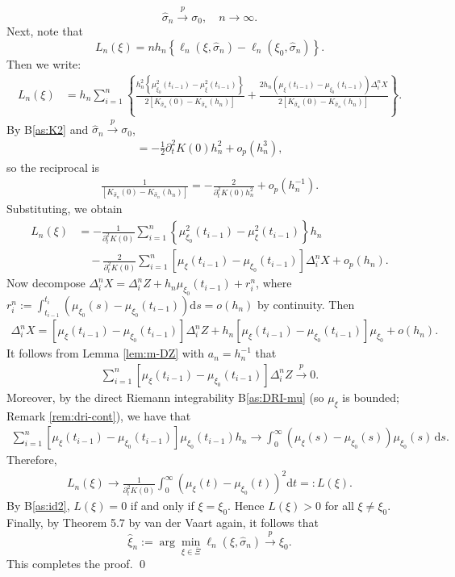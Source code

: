 \documentclass[a4paper,10pt,twoside]{article}
\numberwithin{equation}{section}
\def\D{\Delta}
\def\l{\left}
\def\r{\right}
\def\s{\sigma}
\def\p{\partial}
\def\F{\mathcal{F}}
\def\toP{\stackrel{p}{\longrightarrow}}
\def\E{\mathbb{E}}
\def\wh#1{\widehat{#1}}
\def\ol#1{\overline{#1}}
\def\df{\mathrm{d}}
\begin{document}
\[
\wh{\s}_n \toP \s_0,\quad n\to \infty. 
\]
Next, note that 
\[
L_n(\xi) = n h_n \l\{ \ell_n(\xi, \wh{\s}_n) - \ell_n(\xi_0, \wh{\s}_n) \r\}. 
\]
Then we write:
\begin{align*}
L_n(\xi) &= h_n\sum_{i=1}^n \l\{ \frac{ h_n^2 \l\{ \mu_{\xi_0}^2(t_{i-1}) - \mu_\xi^2(t_{i-1}) \r\} }{2 [K_{\wh{\s}_n}(0) - K_{\wh{\s}_n}(h_n)]} + \frac{ 2 h_n (\mu_\xi(t_{i-1}) - \mu_{\xi_0}(t_{i-1})) \D_i^n X }{2 [K_{\wh{\s}_n}(0) - K_{\wh{\s}_n}(h_n)]} \r\}.
\end{align*}
By B\ref{as:K2} and $\wh{\s}_n \toP \s_0$,
\begin{align*}
[K_{\wh{\s}_n}(0) - K_{\wh{\s}_n}(h_n)] = -\frac{1}{2} \p_t^2 K(0) h_n^2 + o_p(h_n^3),
\end{align*}
so the reciprocal is
\begin{align*}
\frac{1}{[K_{\wh{\s}_n}(0) - K_{\wh{\s}_n}(h_n)]} = -\frac{2}{\p_t^2 K(0) h_n^2} + o_p(h_n^{-1}).
\end{align*}
Substituting, we obtain
\begin{align*}
L_n(\xi) &= -\frac{1}{\p_t^2 K(0)} \sum_{i=1}^n \l\{ \mu_{\xi_0}^2(t_{i-1}) - \mu_\xi^2(t_{i-1}) \r\}h_n  \\
&\quad - \frac{2}{\p_t^2 K(0)} \sum_{i=1}^n[\mu_\xi(t_{i-1}) - \mu_{\xi_0}(t_{i-1})]\D_i^n X + o_p(h_n).
\end{align*}
Now decompose $\D_i^n X = \D_i^n Z + h_n \mu_{\xi_0}(t_{i-1}) + r_i^n$, where $r_i^n := \int_{t_{i-1}}^{t_i} (\mu_{\xi_0}(s) - \mu_{\xi_0}(t_{i-1})) \df s = o(h_n)$ by continuity.
Then
\begin{align*}
[\mu_\xi(t_{i-1}) - \mu_{\xi_0}(t_{i-1})] \D_i^n X = [\mu_\xi(t_{i-1}) - \mu_{\xi_0}(t_{i-1})] \D_i^n Z + h_n [\mu_\xi(t_{i-1}) - \mu_{\xi_0}(t_{i-1})] \mu_{\xi_0} + o(h_n).
\end{align*}
It follows from Lemma \ref{lem:m-DZ} with $a_n=h_n^{-1}$ that 
\begin{align*}
\sum_{i=1}^n [\mu_\xi(t_{i-1}) - \mu_{\xi_0}(t_{i-1})]\D_i^n Z \toP 0. 
\end{align*}
Moreover,  by the direct Riemann integrability B\ref{as:DRI-mu} (so $\mu_\xi$ is bounded; Remark \ref{rem:dri-cont}), we have that 
\begin{align*}
\sum_{i=1}^n [\mu_\xi(t_{i-1}) - \mu_{\xi_0}(t_{i-1})] \mu_{\xi_0}(t_{i-1}) h_n \to \int_0^\infty (\mu_\xi(s) - \mu_{\xi_0}(s)) \mu_{\xi_0}(s)\,\df s. 
\end{align*} 
Therefore,
\begin{align*}
L_n(\xi) \to \frac{1}{\p_t^2 K(0)} \int_0^\infty (\mu_\xi(t) - \mu_{\xi_0}(t))^2 \df t =: L(\xi).
\end{align*}
By B\ref{as:id2}, $L(\xi) = 0$ if and only if $\xi = \xi_0$. Hence $L(\xi) > 0$ for all $\xi \ne \xi_0$.
Finally, by Theorem 5.7 by van der Vaart \cite{v98} again, it follows that
\[
\wh{\xi}_n := \arg\min_{\xi \in \ol{\Xi}} \ell_n(\xi, \wh{\s}_n) \toP \xi_0.
\]
This completes the proof. \qed
\end{document}
